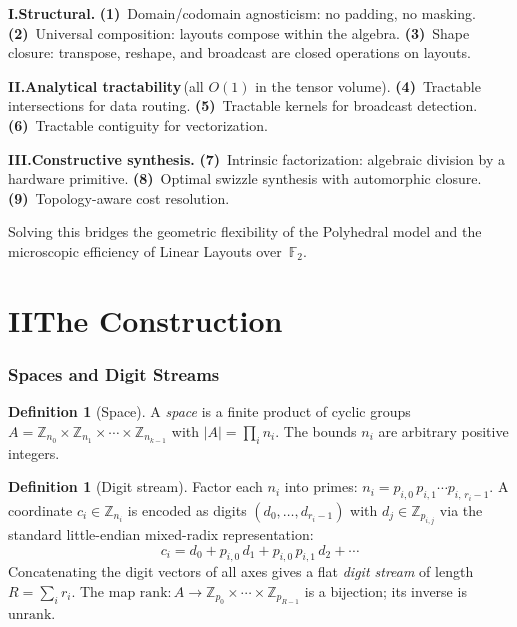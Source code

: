 \documentclass[11pt]{article}
\theoremstyle{definition}
\newtheorem{definition}[theorem]{Definition}
\theoremstyle{remark}
\newcommand{\Z}{\mathbb{Z}}
\newcommand{\F}{\mathbb{F}}
\newcommand{\rank}{\mathrm{rank}}
\newcommand{\unrank}{\mathrm{unrank}}
\begin{document}
\medskip
\noindent\textbf{I.\;Structural.}\;
\textbf{(1)}~Domain/codomain agnosticism: no padding, no masking.
\textbf{(2)}~Universal composition: layouts compose within the algebra.
\textbf{(3)}~Shape closure: transpose, reshape, and broadcast are closed operations on layouts.

\medskip
\noindent\textbf{II.\;Analytical tractability}\,(all $O(1)$ in the tensor volume).
\textbf{(4)}~Tractable intersections for data routing.
\textbf{(5)}~Tractable kernels for broadcast detection.
\textbf{(6)}~Tractable contiguity for vectorization.

\medskip
\noindent\textbf{III.\;Constructive synthesis.}\;
\textbf{(7)}~Intrinsic factorization: algebraic division by a hardware primitive.
\textbf{(8)}~Optimal swizzle synthesis with automorphic closure.
\textbf{(9)}~Topology-aware cost resolution.

\medskip
\noindent Solving this bridges the geometric flexibility of the Polyhedral model and the microscopic efficiency of Linear Layouts over~$\F_2$.

\part*{II\quad The Construction}

\section{Spaces and Digit Streams}

\begin{definition}[Space]
A \emph{space} is a finite product of cyclic groups
$A = \Z_{n_0} \times \Z_{n_1} \times \cdots \times \Z_{n_{k-1}}$
with $|A| = \prod_i n_i$.
The bounds $n_i$ are arbitrary positive integers.
\end{definition}

\begin{definition}[Digit stream]
Factor each $n_i$ into primes: $n_i = p_{i,0}\, p_{i,1}\cdots p_{i,\,r_i-1}$.
A coordinate $c_i \in \Z_{n_i}$ is encoded as digits $(d_0,\ldots,d_{r_i-1})$ with $d_j \in \Z_{p_{i,j}}$ via the standard little-endian mixed-radix representation:
\[
c_i = d_0 + p_{i,0}\,d_1 + p_{i,0}\,p_{i,1}\,d_2 + \cdots
\]
Concatenating the digit vectors of all axes gives a flat \emph{digit stream} of length $R = \sum_i r_i$.
The map $\rank: A \to \Z_{p_0}\times\cdots\times\Z_{p_{R-1}}$ is a bijection; its inverse is $\unrank$.
\end{definition}
\end{document}
